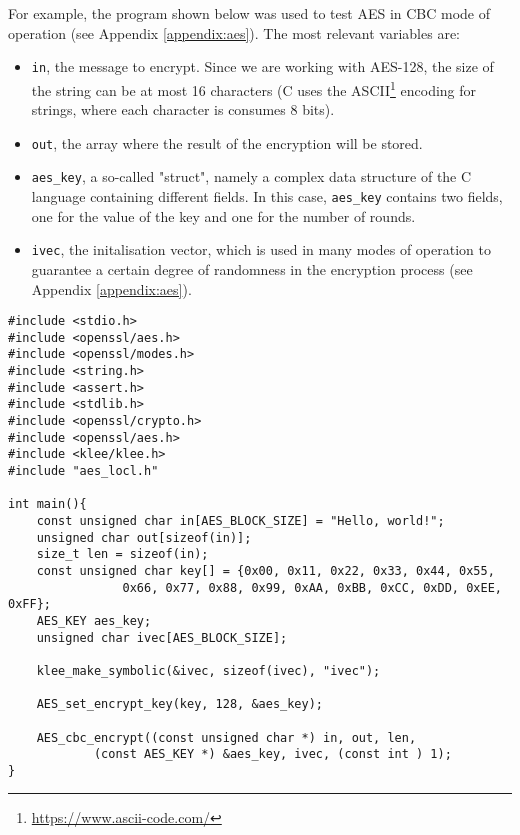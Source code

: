 \documentclass[12pt,a4paper]{book}
\theoremstyle{definition}
\begin{document}
	For example, the program shown below was used to test AES in CBC mode of operation (see Appendix \ref{appendix:aes}). The most relevant variables are:
	\begin{itemize}
		\item \texttt{in}, the message to encrypt. Since we are working with AES-128, the size of the string can be at most 16 characters (C uses the ASCII\footnote{\url{https://www.ascii-code.com/}} encoding for strings, where each character is consumes 8 bits).
		\item \texttt{out}, the array where the result of the encryption will be stored.
		\item \texttt{aes\_key}, a so-called "struct", namely a complex data structure of the C language containing different fields. In this case, \texttt{aes\_key} contains two fields, one for the value of the key and one for the number of rounds.
		\item \texttt{ivec}, the initalisation vector, which is used in many modes of operation to guarantee a certain degree of randomness in the encryption process (see Appendix \ref{appendix:aes}).
	\end{itemize}
	\begin{lstlisting}[caption=\texttt{testing\_AES\_CBC.c}, label=test-aes-cbc]
#include <stdio.h>
#include <openssl/aes.h>
#include <openssl/modes.h>
#include <string.h>
#include <assert.h>
#include <stdlib.h>
#include <openssl/crypto.h>
#include <openssl/aes.h>
#include <klee/klee.h>
#include "aes_locl.h"

int main(){
	const unsigned char in[AES_BLOCK_SIZE] = "Hello, world!";
	unsigned char out[sizeof(in)];
	size_t len = sizeof(in);
	const unsigned char key[] = {0x00, 0x11, 0x22, 0x33, 0x44, 0x55,
				0x66, 0x77, 0x88, 0x99, 0xAA, 0xBB, 0xCC, 0xDD, 0xEE, 0xFF};
	AES_KEY aes_key;
	unsigned char ivec[AES_BLOCK_SIZE];	
	
	klee_make_symbolic(&ivec, sizeof(ivec), "ivec");
			
	AES_set_encrypt_key(key, 128, &aes_key);
			
	AES_cbc_encrypt((const unsigned char *) in, out, len, 
			(const AES_KEY *) &aes_key, ivec, (const int ) 1);
}
	\end{lstlisting}
	\vspace{3mm}
\end{document}
